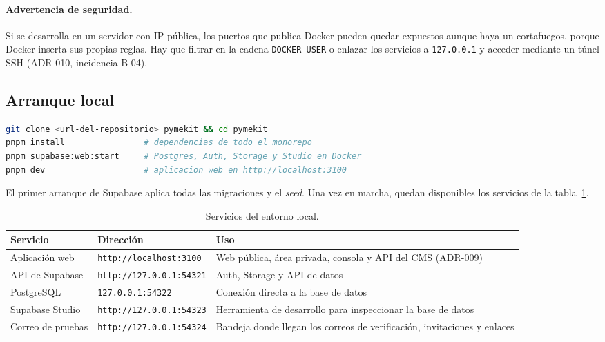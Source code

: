 \paragraph{Advertencia de seguridad.} Si se desarrolla en un servidor con IP
pública, los puertos que publica Docker pueden quedar expuestos aunque haya un
cortafuegos, porque Docker inserta sus propias reglas. Hay que filtrar en la
cadena \texttt{DOCKER-USER} o enlazar los servicios a \texttt{127.0.0.1} y
acceder mediante un túnel SSH (ADR-010, incidencia B-04).

\subsection{Arranque local}

\begin{lstlisting}[language=bash]
git clone <url-del-repositorio> pymekit && cd pymekit
pnpm install                # dependencias de todo el monorepo
pnpm supabase:web:start     # Postgres, Auth, Storage y Studio en Docker
pnpm dev                    # aplicacion web en http://localhost:3100
\end{lstlisting}

El primer arranque de Supabase aplica todas las migraciones y el
\textit{seed}. Una vez en marcha, quedan disponibles los servicios de la
tabla~\ref{tab:dg-puertos}.

\begin{table}[htbp]
  \centering
  \small
  \caption{Servicios del entorno local.}
  \label{tab:dg-puertos}
  \begin{tabularx}{\textwidth}{@{}l>{\raggedright\arraybackslash}p{4.4cm}X@{}}
    \toprule
    \textbf{Servicio} & \textbf{Dirección} & \textbf{Uso} \\
    \midrule
    Aplicación web & \texttt{http://localhost:3100} & Web pública, área privada, consola y API del CMS (ADR-009) \\
    API de Supabase & \texttt{http://127.0.0.1:54321} & Auth, Storage y API de datos \\
    PostgreSQL & \texttt{127.0.0.1:54322} & Conexión directa a la base de datos \\
    Supabase Studio & \texttt{http://127.0.0.1:54323} & Herramienta de desarrollo para inspeccionar la base de datos \\
    Correo de pruebas & \texttt{http://127.0.0.1:54324} & Bandeja donde llegan los correos de verificación, invitaciones y enlaces \\
    \bottomrule
  \end{tabularx}
\end{table}

